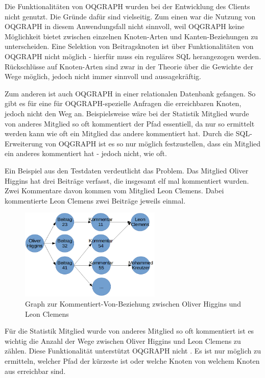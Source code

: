 Die Funktionalitäten von OQGRAPH wurden bei der Entwicklung des Clients nicht genutzt. Die Gründe dafür sind vielseitig. Zum einen war die Nutzung von OQGRAPH in diesem Anwendungsfall nicht sinnvoll, weil OQGRAPH keine Möglichkeit bietet zwischen einzelnen Knoten-Arten und Kanten-Beziehungen zu unterscheiden. Eine Selektion von Beitragsknoten ist über Funktionalitäten von OQGRAPH nicht möglich - hierfür muss ein reguläres SQL herangezogen werden. Rückschlüsse auf Knoten-Arten sind zwar in der Theorie über die Gewichte der Wege möglich, jedoch nicht immer sinnvoll und aussagekräftig.

Zum anderen ist auch OQGRAPH in einer relationalen Datenbank \grqq gefangen\grqq{}. So gibt es für eine für OQGRAPH-spezielle Anfragen die erreichbaren Knoten, jedoch nicht den Weg an. Beispielsweise wäre bei der Statistik \grqq Mitglied wurde von anderes Mitglied so oft kommentiert\grqq{} der Pfad essentiell, da nur so ermittelt werden kann wie oft ein Mitglied das andere kommentiert hat. Durch die SQL-Erweiterung von OQGRAPH ist es so nur möglich festzustellen, dass ein Mitglied ein anderes kommentiert hat - jedoch nicht, wie oft.

Ein Beispiel aus den Testdaten verdeutlicht das Problem. Das Mitglied \grqq Oliver Higgins\grqq{} hat drei Beiträge verfasst, die insgesamt elf mal kommentiert wurden. Zwei Kommentare davon kommen vom Mitglied \grqq Leon Clemens\grqq{}. Dabei kommentierte Leon Clemens zwei Beiträge jeweils einmal.

\begin{figure}	
	\centering
	\includegraphics[width=0.6\textwidth]{images/graph.png}
	\caption{Graph zur Kommentiert-Von-Beziehung zwischen Oliver Higgins und Leon Clemens}
\end{figure}

Für die Statistik \grqq Mitglied wurde von anderes Mitglied so oft kommentiert\grqq{} ist es wichtig die Anzahl der Wege zwischen Oliver Higgins und Leon Clemens zu zählen. Diese Funktionalität unterstützt OQGRAPH nicht \cite{OQGRAPH-Examples}. Es ist nur möglich zu ermitteln, welcher Pfad der kürzeste ist oder welche Knoten von welchem Knoten aus erreichbar sind.

